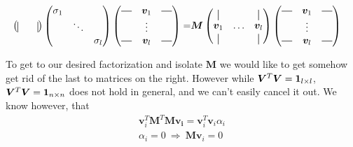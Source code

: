 \begin{align}
\begin{pmatrix}
        \vertbar &        & \vertbar 
        \end{pmatrix}
        \begin{pmatrix}
            \sigma_1 &        &          \\
                     & \ddots &          \\ 
                     &        & \sigma_l
        \end{pmatrix}
        \begin{pmatrix}
            \horzbar & \bm{v}_1 & \horzbar \\
                      & \vdots   &  \\
            \horzbar & \bm{v}_l &  \horzbar \\
        \end{pmatrix} 
        =&
        \bm{M}
        \begin{pmatrix}
        \vertbar &        & \vertbar \\
        \bm{v}_1 & \hdots & \bm{v}_l \\
        \vertbar &        & \vertbar 
        \end{pmatrix}
        \begin{pmatrix}
            \horzbar & \bm{v}_1 & \horzbar \\
                      & \vdots   &  \\
            \horzbar & \bm{v}_l &  \horzbar \\
        \end{pmatrix} 
    \end{align}
    
    To get to our desired factorization and isolate $\bm{M}$ we would like to get somehow get rid of the last to matrices on the right.
    However while $\bm{V}^T \bm{V} = \bm{1}_{l \times l}$, $\bm{V}^T \bm{V} = \bm{1}_{n \times n}$ does not hold in general, and we can't easily 
    cancel it out.
    We know however, that 
    \begin{align}
        \bm{v}_i^T \bm{M}^T \bm{M} \bm{v_i} =  \bm{v}_i^T \bm{v}_i \alpha_i \\
        \alpha_i = 0 \ \Rightarrow \ \bm{Mv}_i = 0
    \end{align}
    \allowdisplaybreaks
    

